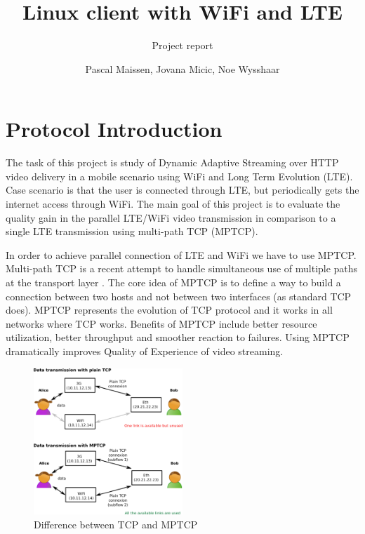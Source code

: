 \documentclass{llncs}
\begin{document}
\title{Linux client with WiFi and LTE}
\subtitle{Project report}
\author{Pascal Maissen, Jovana Micic, Noe Wysshaar} 
\maketitle

\section{Protocol Introduction}
The task of this project is study of Dynamic Adaptive Streaming over HTTP video delivery in a mobile scenario using WiFi and Long Term Evolution (LTE). Case scenario is that the user is connected through LTE, but periodically gets the internet access through WiFi. The main goal of this project is to evaluate the quality gain in the parallel LTE/WiFi video transmission in comparison to a single LTE transmission using multi-path TCP (MPTCP).

In order to achieve parallel connection of LTE and WiFi we have to use MPTCP. Multi-path TCP is a  recent attempt  to handle simultaneous use of multiple paths at the transport layer \cite{MPTCP}. The core idea of MPTCP is to define a way to build a connection between two hosts and not between two interfaces (as standard TCP does). MPTCP represents the evolution of TCP protocol and it works in all networks where TCP works.  Benefits of MPTCP include better resource utilization, better throughput and smoother reaction to failures. Using MPTCP dramatically improves Quality of Experience of video streaming. 

\begin{figure}[H]
\centering
\includegraphics[width=0.5\textwidth]{mptcp.png}
\caption{\label{fig:mptcp} Difference between TCP and MPTCP}
\end{figure}
\end{document}
